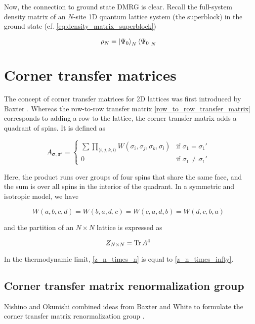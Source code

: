 Now, the connection to ground state DMRG is clear. Recall the full-system
density matrix of an $N$-site 1D quantum lattice system (the superblock) in the
ground state (cf. \eqref{eq:density_matrix_superblock})

\begin{equation}
  \rho_N = \ket{\Psi_0}_{N}\bra{\Psi_0}_{N}
\end{equation}





\section{Corner transfer matrices}

The concept of corner transfer matrices for 2D lattices was first introduced by
Baxter \cite{baxter1968dimers, baxter1978variational, baxter1982exactly}.
Whereas the row-to-row transfer matrix \eqref{row_to_row_transfer_matrix}
corresponds to adding a row to the lattice, the corner transfer matrix adds
a quadrant of spins. It is defined as

\begin{equation}
  A_{\bm{\sigma}, \bm{\sigma'}} =
  \begin{cases}
    \sum \prod_{\langle i, j, k, l \rangle} W(\sigma_i, \sigma_j, \sigma_k, \sigma_l) & \text{if } \sigma_{1} = \sigma_{1}' \\
    0 & \text{if } \sigma_{1} \neq \sigma_{1}'
  \end{cases}
\end{equation}

Here, the product runs over groups of four spins that share the same face, and
the sum is over all spins in the interior of the quadrant.
In a symmetric and isotropic model, we have

\begin{equation}
  W(a, b, c, d) = W(b, a, d, c) = W(c, a, d, b) = W(d, c, b, a)
\end{equation}

and the partition of an $N \times N$ lattice is expressed as

\begin{equation}\label{z_n_times_n}
  Z_{N \times N} = \operatorname{Tr} A^4
\end{equation}

In the thermodynamic limit, \eqref{z_n_times_n} is equal to \eqref{z_n_times_infty}.



\subsection{Corner transfer matrix renormalization group}

Nishino and Okunishi combined ideas from Baxter and White to formulate the
corner transfer matrix renormalization group \cite{nishino1996corner}.
